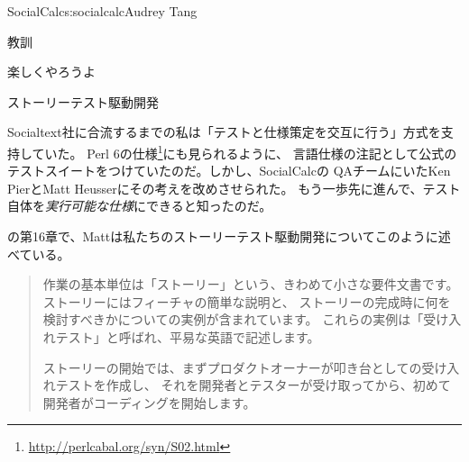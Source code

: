 \begin{aosachapter}{SocialCalc}{s:socialcalc}{Audrey Tang}
\begin{aosasect1}{教訓}
\begin{aosasect2}{楽しくやろうよ}
\end{aosasect2}

\begin{aosasect2}{ストーリーテスト駆動開発}

Socialtext社に合流するまでの私は「テストと仕様策定を交互に行う」方式を支持していた。
Perl 6の仕様\footnote{\url{http://perlcabal.org/syn/S02.html}}にも見られるように、
言語仕様の注記として公式のテストスイートをつけていたのだ。しかし、SocialCalcの
QAチームにいたKen PierとMatt Heusserにその考えを改めさせられた。
もう一歩先に進んで、テスト自体を\emph{実行可能な仕様}にできると知ったのだ。


\cite{bib:goucher:test}の第16章で、Mattは私たちのストーリーテスト駆動開発についてこのように述べている。

\begin{quotation}

  作業の基本単位は「ストーリー」という、きわめて小さな要件文書です。
  ストーリーにはフィーチャの簡単な説明と、
  ストーリーの完成時に何を検討すべきかについての実例が含まれています。
  これらの実例は「受け入れテスト」と呼ばれ、平易な英語で記述します。

  ストーリーの開始では、まずプロダクトオーナーが叩き台としての受け入れテストを作成し、
  それを開発者とテスターが受け取ってから、初めて開発者がコーディングを開始します。


\end{quotation}
\end{aosasect2}
\end{aosasect1}
\end{aosachapter}
